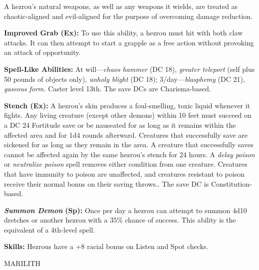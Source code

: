 \documentclass{article}
\begin{document}
A hezrou's natural weapons, as well as any weapons it wields, are treated as chaotic-aligned 
and evil-aligned for the purpose of overcoming damage reduction.

\textbf{Improved Grab (Ex): }To use this ability, a hezrou must hit with both claw 
attacks. It can then attempt to start a grapple as a free action without provoking 
an attack of opportunity.

\textbf{Spell-Like Abilities:} At will---\textit{chaos hammer }(DC 18), \textit{greater 
teleport }(self plus 50 pounds of objects only), \textit{unholy blight }(DC 18); 
3/day---\textit{blasphemy }(DC 21), \textit{gaseous form. }Caster level 13th. The 
save DCs are Charisma-based.

\textbf{Stench (Ex): }A hezrou's skin produces a foul-smelling, toxic liquid whenever 
it fights. Any living creature (except other demons) within 10 feet must succeed 
on a DC 24 Fortitude save or be nauseated for as long as it remains within the 
affected area and for 1d4 rounds afterward. Creatures that successfully save are 
sickened for as long as they remain in the area. A creature that successfully saves 
cannot be affected again by the same hezrou's stench for 24 hours. A \textit{delay 
poison }or \textit{neutralize poison }spell removes either condition from one creature. 
Creatures that have immunity to poison are unaffected, and creatures resistant 
to poison receive their normal bonus on their saving throws.. The save DC is Constitution-based.

\textit{\textbf{Summon Demon }}\textbf{(Sp): }Once per day a hezrou can attempt 
to summon 4d10 dretches or another hezrou with a 35\% chance of success. This ability 
is the equivalent of a 4th-level spell.

\textbf{Skills:} Hezrous have a +8 racial bonus on Listen and Spot checks.

\vspace{12pt}
MARILITH
\end{document}
